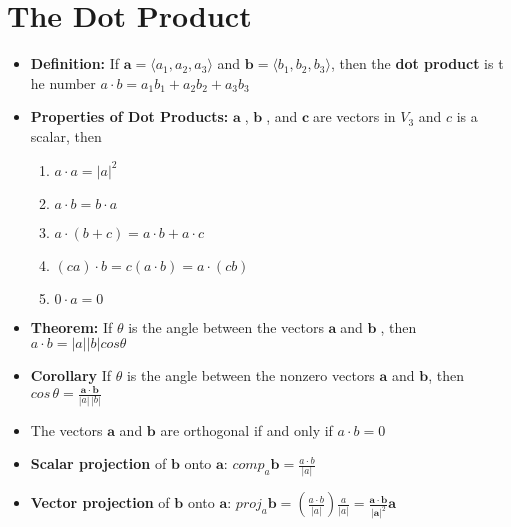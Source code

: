 \documentclass{report}
\newcommand{\va}{$\mathbf{a}\;$}
\newcommand{\vb}{$\mathbf{b}\;$}
\newcommand{\vc}{$\mathbf{c}\;$}
\begin{document}
	\section{The Dot Product}
		\begin{itemize}\addtolength{\leftskip}{2em}
			\item \textbf{Definition: }If $\mathbf{a}=\langle a_1,a_2,a_3 \rangle$ and $\mathbf{b}=\langle b_1,b_2,b_3 \rangle$, then the \textbf{dot product} is t he number $a\cdot b=a_1b_1+a_2b_2+a_3b_3$
			\item \textbf{Properties of Dot Products:} \va, \vb, and \vc are vectors in $V_3$ and $c$ is a scalar, then\
			\begin{enumerate}\addtolength{\leftskip}{4em}
				\item \large$a\cdot a=|a|^2$
				\item \large$a\cdot b=b\cdot a$
				\item \large$a\cdot (b+c)=a\cdot b+a\cdot c$
				\item \large$(ca)\cdot b=c(a\cdot b)=a\cdot (cb)$
				\item \large$0\cdot a=0$
			\end{enumerate}
			\large\item \textbf{Theorem:} If $\theta$ is  the angle between the vectors \va and \vb, then
				\subitem $a\cdot b=|a||b|cos\theta$
			\large\item \textbf{Corollary} If $\theta$ is the angle between the nonzero vectors $\mathbf{a}$ and $\mathbf{b}$, then
				\subitem $cos\,\theta=\frac{\mathbf{a}\cdot\mathbf{b}}{|a|\,|b|}$
			\large\item The vectors $\mathbf{a}$ and $\mathbf{b}$ are orthogonal if and only if $a\cdot b=0$
			\large\item \textbf{Scalar projection} of $\mathbf{b}$ onto $\mathbf{a}$:
				\Large\subitem $comp_a\mathbf{b}=\frac{a\cdot b}{|a|}$
			\large\item \textbf{Vector projection} of $\mathbf{b}$ onto $\mathbf{a}$:
				\Large\subitem $proj_a\mathbf{b}=(\frac{a\cdot b}{|a|})\frac{a}{|a|}=\frac{\mathbf{a}\cdot\mathbf{b}}{|\mathbf{a}|^2}\mathbf{a}$
		\end{itemize}
\end{document}
